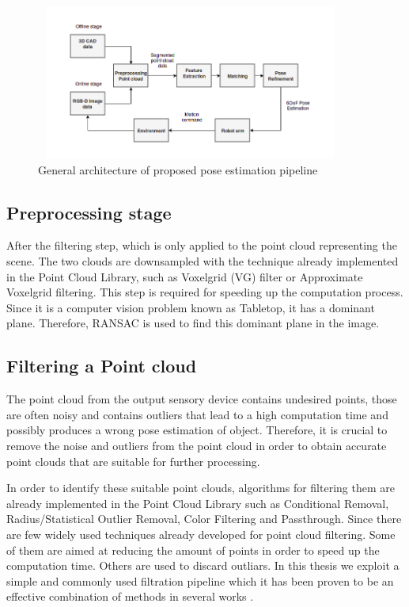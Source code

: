 \begin{figure}[!h]
\begin{center}
\includegraphics[width=4in,height=2in]{diagrams/pipelineend.png}
\caption{General architecture of proposed pose estimation pipeline}%
\label{fig:pipeline}
\end{center}
\end{figure}

\subsection{Preprocessing stage}

After the filtering step, which is only applied to the point cloud representing the scene. The two clouds are downsampled with the technique already implemented in the Point Cloud Library, such as Voxelgrid (VG) filter or Approximate Voxelgrid filtering. This step is required for speeding up the computation process. 
Since it is a computer vision problem known as Tabletop, it has a dominant plane. Therefore, RANSAC is used to find this dominant plane in the image. 

\subsection{Filtering a Point cloud}

The point cloud from the output sensory device contains undesired points, those are often noisy and contains outliers that lead to a high computation time and possibly produces a wrong pose estimation of object. Therefore, it is crucial to remove the noise and outliers from the point cloud in order to obtain accurate point clouds that are suitable for further processing. 

In order to identify these suitable point clouds, algorithms for filtering them are already implemented in the Point Cloud Library such as Conditional Removal, Radius/Statistical Outlier Removal, Color Filtering and Passthrough. 
Since there are few widely used techniques already developed for point cloud filtering. Some of them are aimed at reducing the amount of points in order to speed up the computation time. Others are used to discard outliars. In this thesis we exploit a simple and commonly used filtration pipeline which it has been proven to be an effective combination of methods in several works \cite{algFiltering}.

